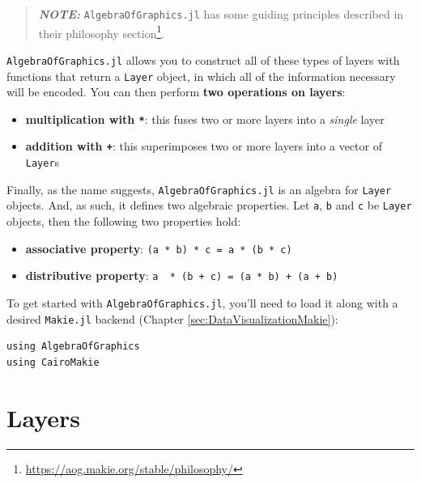 \documentclass[
  notoc %
]{tufte-book}
\DeclareRobustCommand{\href}[2]{#2\footnote{\url{#1}}}
\providecommand{\tightlist}{%
  \setlength{\itemsep}{0pt}\setlength{\parskip}{0pt}
}
\newcommand{\passthrough}[1]{#1}
\begin{document}
\begin{quote}
\textbf{\emph{NOTE:}} \passthrough{\lstinline!AlgebraOfGraphics.jl!} has
some guiding principles described in their
\href{https://aog.makie.org/stable/philosophy/}{philosophy section}.
\end{quote}

\passthrough{\lstinline!AlgebraOfGraphics.jl!} allows you to construct
all of these types of layers with functions that return a
\passthrough{\lstinline!Layer!} object, in which all of the information
necessary will be encoded. You can then perform \textbf{two operations
on layers}:

\begin{itemize}
\tightlist
\item
  \textbf{multiplication with \passthrough{\lstinline!*!}}: this fuses
  two or more layers into a \emph{single} layer
\item
  \textbf{addition with \passthrough{\lstinline!+!}}: this superimposes
  two or more layers into a vector of \passthrough{\lstinline!Layer!}s
\end{itemize}

Finally, as the name suggests,
\passthrough{\lstinline!AlgebraOfGraphics.jl!} is an algebra for
\passthrough{\lstinline!Layer!} objects. And, as such, it defines two
algebraic properties. Let \passthrough{\lstinline!a!},
\passthrough{\lstinline!b!} and \passthrough{\lstinline!c!} be
\passthrough{\lstinline!Layer!} objects, then the following two
properties hold:

\begin{itemize}
\tightlist
\item
  \textbf{associative property}:
  \passthrough{\lstinline!(a * b) * c = a * (b * c)!}
\item
  \textbf{distributive property}:
  \passthrough{\lstinline!a  * (b + c) = (a * b) + (a + b)!}
\end{itemize}

To get started with \passthrough{\lstinline!AlgebraOfGraphics.jl!},
you'll need to load it along with a desired
\passthrough{\lstinline!Makie.jl!} backend (Chapter
\ref{sec:DataVisualizationMakie}):

\begin{lstlisting}
using AlgebraOfGraphics
using CairoMakie
\end{lstlisting}

\hypertarget{sec:aog_layers}{%
\section{Layers}\label{sec:aog_layers}}
\end{document}
